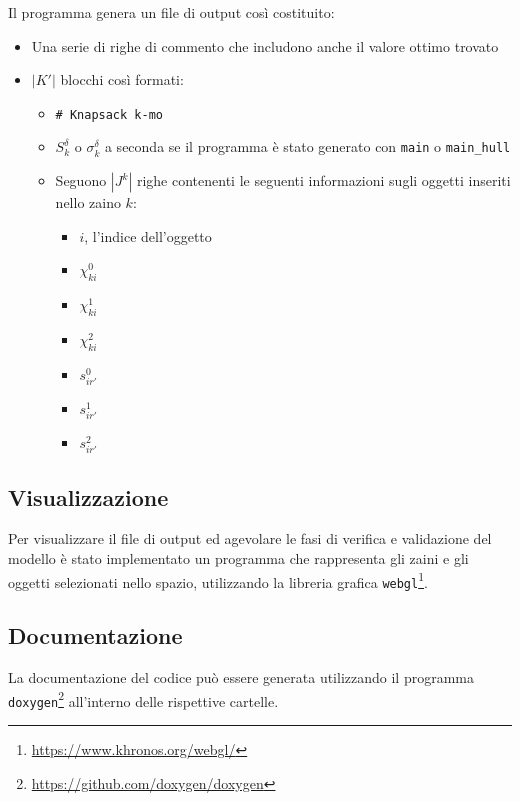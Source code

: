 \documentclass{scrartcl}
\begin{document}
Il programma genera un file di output così costituito:
\begin{itemize}
	\item Una serie di righe di commento che includono anche il valore ottimo trovato
	\item $|K'|$ blocchi così formati:
		\begin{itemize}
			\item \verb|# Knapsack k-mo|
			\item $S_k^\delta$ o $\sigma_k^\delta$ a seconda se il programma è stato generato con \verb|main| o \verb|main_hull|
			\item Seguono $|J^k|$ righe contenenti le seguenti informazioni sugli oggetti inseriti nello zaino $k$:
			\begin{itemize}
				\item $i$, l'indice dell'oggetto
				\item $\chi_{ki}^0$
				\item $\chi_{ki}^1$
				\item $\chi_{ki}^2$
				\item $s_{ir'}^0$
				\item $s_{ir'}^1$
				\item $s_{ir'}^2$
			\end{itemize}
		\end{itemize}
\end{itemize}






\subsection{Visualizzazione}
Per visualizzare il file di output ed agevolare le fasi di verifica e validazione del modello è stato implementato un programma che rappresenta gli zaini e gli oggetti selezionati nello spazio, utilizzando la libreria grafica \verb|webgl|\footnote{\url{https://www.khronos.org/webgl/}}.

\subsection{Documentazione}
La documentazione del codice può essere generata utilizzando il programma \verb|doxygen|\footnote{\url{https://github.com/doxygen/doxygen}} all'interno delle rispettive cartelle.
\end{document}
